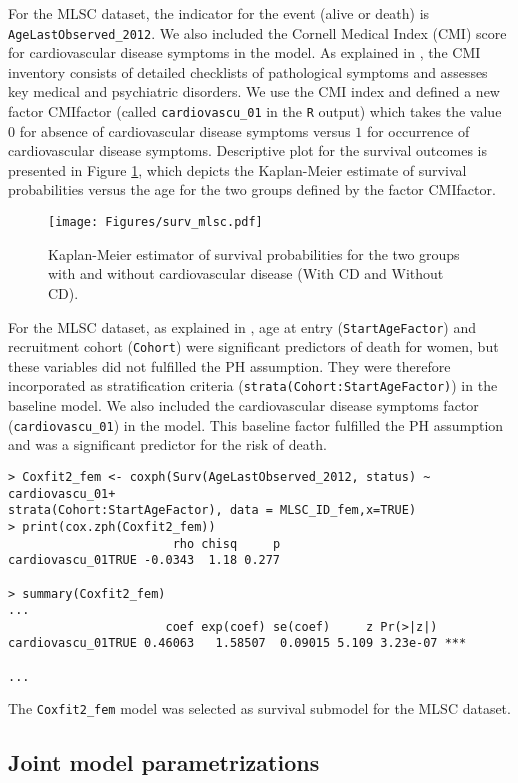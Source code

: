 \documentclass[12pt]{article}
\begin{document}
For the MLSC dataset, the indicator for the event (alive or death) is \texttt{AgeLastObserved\_2012}. We also included the Cornell Medical Index (CMI) score for cardiovascular disease symptoms in the model. As explained in \cite{aichele2015life}, the CMI inventory consists of detailed checklists of pathological symptoms and assesses key medical and psychiatric disorders. We use the CMI index and defined a new factor CMIfactor (called \texttt{cardiovascu\_01} in the \texttt{R} output) which takes the value $0$ for absence of cardiovascular disease symptoms versus $1$ for occurrence of cardiovascular disease symptoms. 
Descriptive plot for the survival outcomes is presented in Figure \ref{KM_MLSC}, which depicts the Kaplan-Meier estimate of survival probabilities versus the age for the two groups defined by the factor CMIfactor.
\begin{figure}[!tb]
\centering
\texttt{[image: Figures/surv\_mlsc.pdf]}
\caption{Kaplan-Meier estimator of survival probabilities for the two groups with and without cardiovascular disease (With CD and Without CD).}
\label{KM_MLSC}
\end{figure}
For the MLSC dataset, as explained in \cite{aichele2015life}, age at entry (\texttt{StartAgeFactor}) and recruitment cohort (\texttt{Cohort}) were significant predictors of death for women, but these variables did not fulfilled the PH assumption. They were therefore incorporated as stratification criteria (\texttt{strata(Cohort:StartAgeFactor)}) in the baseline model. 
We also included the cardiovascular disease symptoms factor (\texttt{cardiovascu\_01}) in the model. This baseline factor fulfilled the PH assumption and was a significant predictor for the risk of death.
\begin{verbatim}
> Coxfit2_fem <- coxph(Surv(AgeLastObserved_2012, status) ~ cardiovascu_01+
strata(Cohort:StartAgeFactor), data = MLSC_ID_fem,x=TRUE)
> print(cox.zph(Coxfit2_fem))
                       rho chisq     p
cardiovascu_01TRUE -0.0343  1.18 0.277

> summary(Coxfit2_fem)
...
                      coef exp(coef) se(coef)     z Pr(>|z|)    
cardiovascu_01TRUE 0.46063   1.58507  0.09015 5.109 3.23e-07 ***

...
\end{verbatim}
The \texttt{Coxfit2\_fem} model was selected as survival submodel for the MLSC dataset. 

\subsection{Joint model parametrizations}
\label{Joint model parametrizations}
\end{document}
